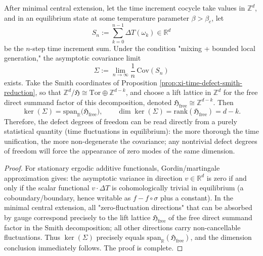 \begin{proposition}\label{prop:xi-defect-free-rank-identifiable-by-covariance-kernel}
After minimal central extension, let the time increment cocycle take values in \(\mathbb Z^d\), and in an equilibrium state at some temperature parameter \(\beta>\beta_c\), let
\[
S_n:=\sum_{k=0}^{n-1}\Delta T(\omega_k)\in\mathbb R^{d}
\]
be the \(n\)-step time increment sum.
Under the condition "mixing + bounded local generation," the asymptotic covariance limit
\[
\Sigma:=\lim_{n\to\infty}\frac{1}{n}\,\mathrm{Cov}(S_n)
\]
exists.
Take the Smith coordinates of Proposition \ref{prop:xi-time-defect-smith-reduction}, so that
\(
\mathbb Z^d/\mathfrak H\cong \mathrm{Tor}\oplus \mathbb Z^{d-k}
\), and choose a lift lattice in \(\mathbb Z^d\) for the free direct summand factor of this decomposition, denoted \(\mathfrak H_{\mathrm{free}}\cong\mathbb Z^{d-k}\).
Then
\[
\ker(\Sigma)=\mathrm{span}_{\mathbb R}\bigl(\mathfrak H_{\mathrm{free}}\bigr),
\qquad
\dim\ker(\Sigma)=\mathrm{rank}(\mathfrak H_{\mathrm{free}})=d-k.
\]
Therefore, the defect degrees of freedom can be read directly from a purely statistical quantity (time fluctuations in equilibrium): the more thorough the time unification, the more non-degenerate the covariance; any nontrivial defect degrees of freedom will force the appearance of zero modes of the same dimension.
\end{proposition}
\begin{proof}
For stationary ergodic additive functionals, Gordin/martingale approximation gives: the asymptotic variance in direction \(v\in\mathbb R^d\) is zero if and only if the scalar functional \(v\cdot\Delta T\) is cohomologically trivial in equilibrium (a coboundary/boundary, hence writable as \(f-f\circ\sigma\) plus a constant).
In the minimal central extension, all "zero-fluctuation directions" that can be absorbed by gauge correspond precisely to the lift lattice \(\mathfrak H_{\mathrm{free}}\) of the free direct summand factor in the Smith decomposition; all other directions carry non-cancellable fluctuations.
Thus \(\ker(\Sigma)\) precisely equals \(\mathrm{span}_{\mathbb R}(\mathfrak H_{\mathrm{free}})\), and the dimension conclusion immediately follows. The proof is complete.
\end{proof}

